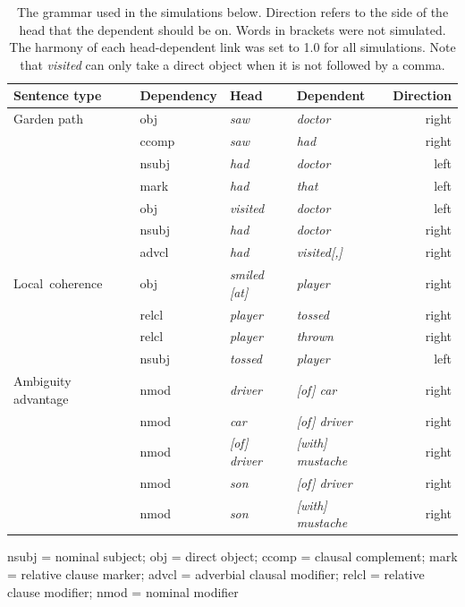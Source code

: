 \documentclass[a4paper, 12pt]{article}
\begin{document}
\begin{table}[hbtp]
\centering
\caption{The grammar used in the simulations below. Direction refers to the
    side of the head that the dependent should be on. Words in brackets were
    not simulated. The harmony of each head-dependent link was set
    to 1.0 for all simulations. Note that \emph{visited} can only take a direct
    object when it is not followed by a comma.}\label{tab:gramm}
\begin{tabularx}{\textwidth}{XXXXr}
\toprule
Sentence type & Dependency & Head & Dependent & Direction \\
\midrule
Garden path & obj & \emph{saw} & \emph{doctor} & right \\
& ccomp & \emph{saw} & \emph{had} & right \\
& nsubj & \emph{had} & \emph{doctor} & left \\
& mark & \emph{had} & \emph{that} & left \\
& obj & \emph{visited} & \emph{doctor} & left \\
& nsubj & \emph{had} & \emph{doctor} & right \\
& advcl & \emph{had} & \emph{visited[,]} & right \\
\midrule
\mbox{Local coherence} & obj & \emph{smiled [at]} & \emph{player} & right\\
& relcl & \emph{player} & \emph{tossed} & right\\
& relcl & \emph{player} & \emph{thrown} & right\\
& nsubj & \emph{tossed} & \emph{player} & left\\
\midrule
Ambiguity \mbox{advantage} & nmod & \emph{driver} & \emph{[of] car} &
right \\
& nmod & \emph{car} & \emph{[of] driver} & right\\
& nmod & \emph{[of] driver} & \emph{[with] \mbox{mustache}} & right\\
& nmod & \emph{son} & \emph{[of] driver} & right\\
& nmod & \emph{son} & \emph{[with] \mbox{mustache}} & right\\
\bottomrule
\end{tabularx}
{\raggedright nsubj = nominal subject; obj = direct object; ccomp = clausal
    complement; mark = relative clause marker; advcl = adverbial clausal
    modifier; relcl = relative clause
    modifier; nmod = nominal modifier \par}
\end{table}
\end{document}
